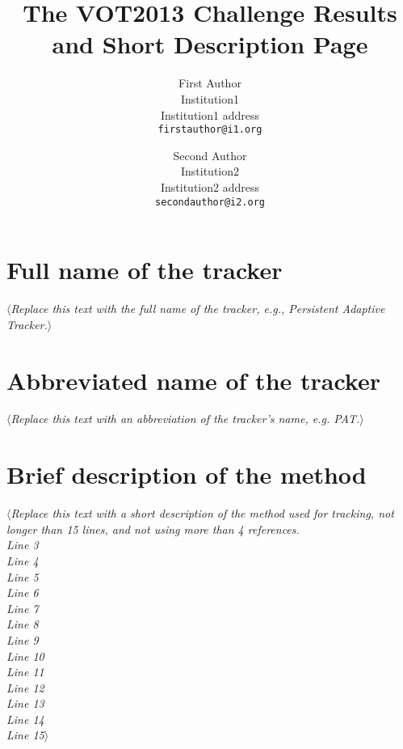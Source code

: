 \documentclass[10pt,oneside]{article}
\date{}
\begin{document}
\title{The VOT2013 Challenge Results and Short Description Page}

\author{First Author\\
Institution1\\
Institution1 address\\
{\tt\small firstauthor@i1.org}
\and
Second Author\\
Institution2\\
Institution2 address\\
{\tt\small secondauthor@i2.org}
}

\newcommand{\replace}[1]{$\langle$\textit{#1}$\rangle$}

\maketitle

\section{Full name of the tracker} 
\replace{Replace this text with the full name of the tracker, e.g., Persistent Adaptive Tracker.}

\section{Abbreviated name of the tracker}
\replace{Replace this text with an abbreviation of the tracker's name, e.g. PAT.}

\section{Brief description of the method}
\replace{Replace this text with a short description of the method used for tracking, not longer than 15 lines,
and not using more than 4 references.\\
Line 3 \\
Line 4 \\
Line 5 \\
Line 6 \\
Line 7 \\
Line 8 \\
Line 9 \\
Line 10\\
Line 11\\
Line 12\\
Line 13\\
Line 14\\
Line 15}
\end{document}

